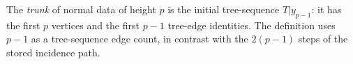 \begin{definition}
The \emph{trunk} of normal data of height $p$ is the initial tree-sequence
$T|y_{p-1}$: it has the first $p$ vertices and the first $p-1$ tree-edge
identities.  The definition uses $p-1$ as a tree-sequence edge count, in
contrast with the $2(p-1)$ steps of the stored incidence path.
\end{definition}
